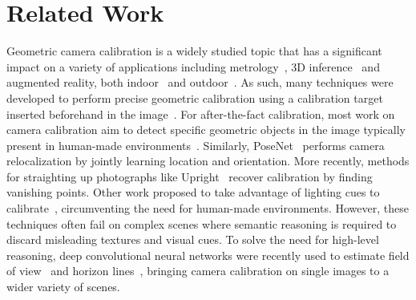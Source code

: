 
\section{Related Work}







Geometric camera calibration is a widely studied topic that has a significant impact on a variety of applications including metrology~\cite{Criminisi2000}, 3D inference~\cite{Criminisi00,Fouhey2013} and augmented reality, both indoor~\cite{hedau-iccv-09,izadinia-cvpr-17} and outdoor~\cite{hoiem-cvpr-06}. As such, many techniques were developed to perform precise geometric calibration using a calibration target inserted beforehand in the image~\cite{Sturm1999,Zhang2002,Heikkila1997,Chen2004}. For after-the-fact calibration, most work on camera calibration aim to detect specific geometric objects in the image typically present in human-made environments~\cite{Rother2000,Melo2013}. Similarly, PoseNet~\cite{kendall-iccv-15} performs camera relocalization by jointly learning location and orientation. More recently, methods for straighting up photographs like Upright~\cite{Lee2014} recover calibration by finding vanishing points. Other work proposed to take advantage of lighting cues to calibrate~\cite{lalonde-ijcv-10,Workman2014}, circumventing the need for human-made environments. However, these techniques often fail on complex scenes where semantic reasoning is required to discard misleading textures and visual cues. To solve the need for high-level reasoning, deep convolutional neural networks were recently used to estimate field of view~\cite{Workman2015a} and horizon lines~\cite{Workman2016}, bringing camera calibration on single images to a wider variety of scenes.

